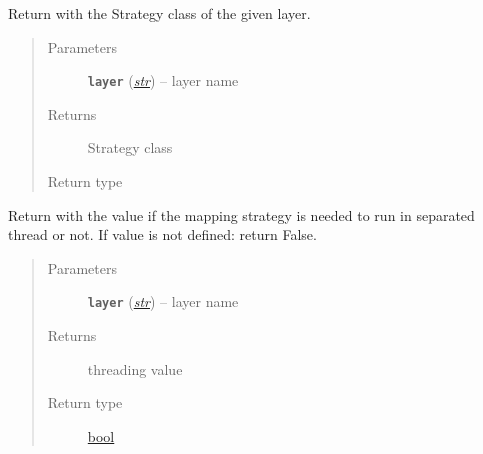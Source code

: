 \documentclass[letterpaper,10pt,english]{sphinxmanual}
\begin{document}
\begin{fulllineitems}

\begin{fulllineitems}
\label{util/misc:escape.util.misc.ESCAPEConfig.get_strategy}
Return with the Strategy class of the given layer.
\begin{quote}\begin{description}
\item[{Parameters}] \leavevmode
\textbf{\texttt{layer}} (\href{https://docs.python.org/2.7/library/functions.html\#str}{\emph{str}}) -- layer name

\item[{Returns}] \leavevmode
Strategy class

\item[{Return type}] \leavevmode
{\hyperref[util/mapping:escape.util.mapping.AbstractMappingStrategy]{\emph{}}}

\end{description}\end{quote}

\end{fulllineitems}


\begin{fulllineitems}
\label{util/misc:escape.util.misc.ESCAPEConfig.get_threaded}
Return with the value if the mapping strategy is needed to run in
separated thread or not. If value is not defined: return False.
\begin{quote}\begin{description}
\item[{Parameters}] \leavevmode
\textbf{\texttt{layer}} (\href{https://docs.python.org/2.7/library/functions.html\#str}{\emph{str}}) -- layer name

\item[{Returns}] \leavevmode
threading value

\item[{Return type}] \leavevmode
\href{https://docs.python.org/2.7/library/functions.html\#bool}{bool}

\end{description}\end{quote}

\end{fulllineitems}


\end{fulllineitems}
\end{document}
